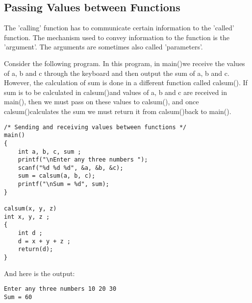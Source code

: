 \subsection{Passing Values between Functions}
The 'calling' function has to communicate certain information to the 'called' function. The mechanism used to convey information to the function is the 'argument'. The arguments are sometimes also called 'parameters'.

Consider the following program. In this program, in main()we receive the values of a, b and c through the keyboard and then output the sum of a, b and c. However, the calculation of sum is done in a different function called calsum(). If sum is to be calculated in calsum()and values of a, b and c are received in main(), then we must pass on these values to calsum(), and once calsum()calculates the sum we must return it from calsum()back to main().

\begin{lstlisting}[style=CStyle]
/* Sending and receiving values between functions */
main()
{
    int a, b, c, sum ;
    printf("\nEnter any three numbers ");
    scanf("%d %d %d", &a, &b, &c);
    sum = calsum(a, b, c);
    printf("\nSum = %d", sum);
}

calsum(x, y, z)
int x, y, z ;
{
    int d ;
    d = x + y + z ;
    return(d);
}
\end{lstlisting}

And here is the output:
\begin{lstlisting}[style=CStyle]
Enter any three numbers 10 20 30
Sum = 60
\end{lstlisting}


